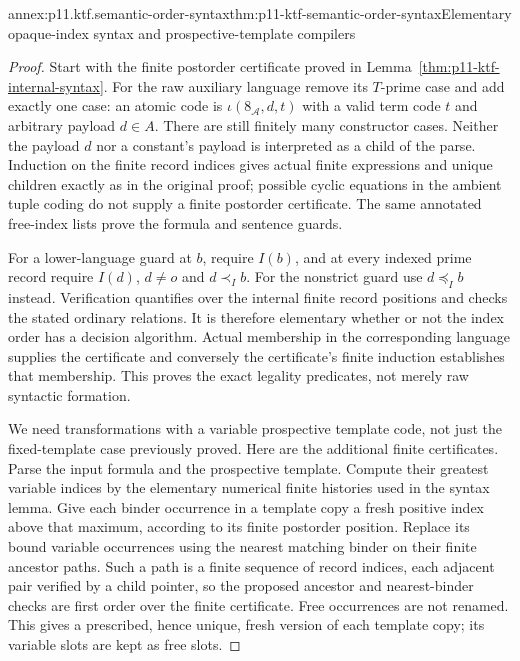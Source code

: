\begin{annexitem}{annex:p11.ktf.semantic-order-syntax}{thm:p11-ktf-semantic-order-syntax}{Elementary opaque-index syntax and prospective-template compilers}
\begin{proof}
Start with the finite postorder certificate proved in
Lemma~\ref{thm:p11-ktf-internal-syntax}. For the raw auxiliary
language remove its \(T\)-prime case and add exactly one case:
an atomic code is \(\iota(8_{\mathcal A},d,t)\) with a
valid term code \(t\) and arbitrary payload \(d\in A\).
There are still finitely many constructor cases. Neither the payload
\(d\) nor a constant's payload is interpreted as a child of
the parse. Induction on the finite record indices gives actual finite
expressions and unique children exactly as in the original proof;
possible cyclic equations in the ambient tuple coding do not supply
a finite postorder certificate. The same annotated free-index lists
prove the formula and sentence guards.

For a lower-language guard at \(b\), require \(I(b)\),
and at every indexed prime record require \(I(d)\), \(d\ne o\)
and \(d\prec_I b\). For the nonstrict guard use
\(d\preceq_I b\) instead. Verification quantifies over the
internal finite record positions and checks the stated ordinary
relations. It is therefore elementary whether or not the index order
has a decision algorithm. Actual membership in the corresponding
language supplies the certificate and conversely the certificate's
finite induction establishes that membership. This proves the exact
legality predicates, not merely raw syntactic formation.

We need transformations with a variable prospective template code,
not just the fixed-template case previously proved. Here are the
additional finite certificates. Parse the input formula and the
prospective template. Compute their greatest variable indices by
the elementary numerical finite histories used in the syntax lemma.
Give each binder occurrence in a template copy a fresh positive
index above that maximum, according to its finite postorder position.
Replace its bound variable occurrences using the nearest matching
binder on their finite ancestor paths. Such a path is a finite
sequence of record indices, each adjacent pair verified by a child
pointer, so the proposed ancestor and nearest-binder checks are
first order over the finite certificate. Free occurrences are not
renamed. This gives a prescribed, hence unique, fresh version of
each template copy; its variable slots are kept as free slots.


\end{proof}
\end{annexitem}
